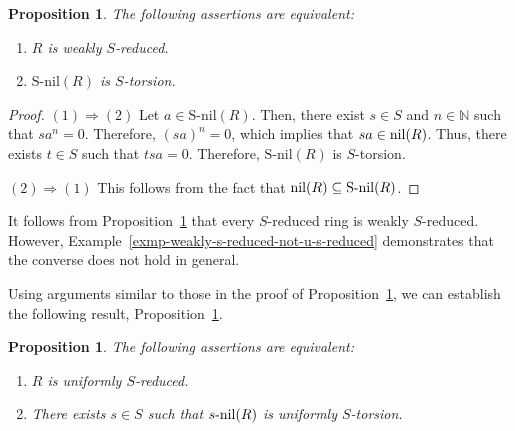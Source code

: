 \documentclass[12pt]{article}
\newtheorem{prop}[thm]{\bf Proposition}
\def\Snil{\mathrm{S\text{-}nil}}
\def\nil{{\rm nil}}
\begin{document}
\begin{prop}\label{prop-s-red-iff-s-torR-is-s-tor} The following assertions are equivalent: 
\begin{enumerate}
\item $R$ is weakly $S$-reduced.
\item $\Snil(R)$ is $S$-torsion.
\end{enumerate}
\end{prop}
\begin{proof}
$(1)\Rightarrow (2)$ Let \( a \in \Snil(R) \). Then, there exist \( s \in S \) and \( n \in \mathbb{N} \) such that \( sa^n = 0 \). Therefore, \( (sa)^n = 0 \), which implies that \( sa \in \nil(R) \). Thus, there exists \( t \in S \) such that \( ts a = 0 \). Therefore, \( \Snil(R) \) is \( S \)-torsion. 

$(2)\Rightarrow (1)$  This follows from the fact that $\nil(R)\subseteq \Snil(R)$. 
\end{proof}

It follows from Proposition~\ref{prop-s-red-iff-s-torR-is-s-tor} that every \( S \)-reduced ring is weakly \( S \)-reduced. However, Example~\ref{exmp-weakly-s-reduced-not-u-s-reduced} demonstrates that the converse does not hold in general.

Using arguments similar to those in the proof of Proposition~\ref{prop-s-red-iff-s-torR-is-s-tor}, we can establish the following result, Proposition~\ref{prop-u-s-red-iff-s-torR-is-u-s-tor}.

\begin{prop}\label{prop-u-s-red-iff-s-torR-is-u-s-tor} The following assertions are equivalent: 
\begin{enumerate}
\item $R$ is uniformly $S$-reduced. 
\item There exists \( s \in S \) such that \( s\text{-}\nil(R) \) is uniformly \( S \)-torsion. 
\end{enumerate}
\end{prop}
\end{document}
